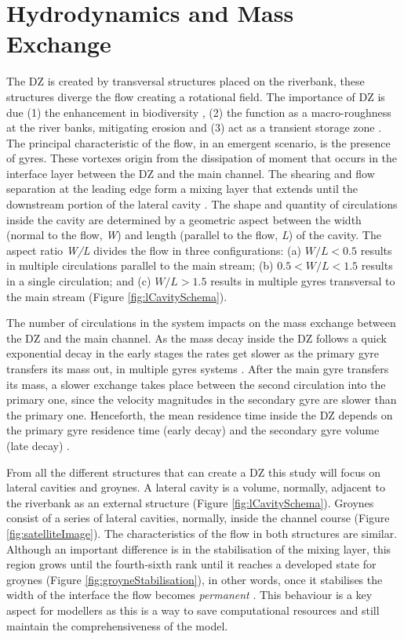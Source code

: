 \section{Hydrodynamics and Mass Exchange}
The DZ is created by transversal structures placed on the riverbank, these structures diverge the flow creating a rotational field. The importance of DZ is due (1) the enhancement in biodiversity \cite{ribi2014,harvey2016}, (2) the function as a macro-roughness at the river banks, mitigating erosion \cite{Juez2018} and (3) act as a transient storage zone \cite{jackson2013,drost2014,jackson2015}. The principal characteristic of the flow, in an emergent scenario, is the presence of gyres. These vortexes origin from the dissipation of moment that occurs in the interface layer between the DZ and the main channel. The shearing and flow separation at the leading edge form a mixing layer that extends until the downstream portion of the lateral cavity \cite{uijttewaal2005,jackson2013}. The shape and quantity of circulations inside the cavity are determined by a geometric aspect between the width (normal to the flow, \textit{W}) and length (parallel to the flow, \textit{L}) of the cavity. The aspect ratio \textit{W/L} divides the flow in three configurations: (a) $W/L<0.5$ results in multiple circulations parallel to the main stream; (b) $0.5<W/L<1.5$ results in a single circulation; and (c) $W/L>1.5$ results in multiple gyres transversal to the main stream \cite{weitbrecht2001,jackson2013,sukhodolov2014}(Figure \ref{fig:lCavitySchema}).

The number of circulations in the system impacts on the mass exchange between the DZ and the main channel. As the mass decay inside the DZ follows a quick exponential decay in the early stages the rates get slower as the primary gyre transfers its mass out, in multiple gyres systems \cite{jackson2012,deOliveira2020}. After the main gyre transfers its mass, a slower exchange takes place between the second circulation into the primary one, since the velocity magnitudes in the secondary gyre are slower than the primary one. Henceforth, the mean residence time inside the DZ depends on the primary gyre residence time (early decay) and the secondary gyre volume (late decay) \cite{jackson2013,deOliveira2020}.

From all the different structures that can create a DZ this study will focus on lateral cavities and groynes. A lateral cavity is a volume, normally, adjacent to the riverbank as an external structure (Figure \ref{fig:lCavitySchema}). Groynes consist of a series of lateral cavities, normally, inside the channel course (Figure \ref{fig:satelliteImage}). The characteristics of the flow in both structures are similar. Although an important difference is in the stabilisation of the mixing layer, this region grows until the fourth-sixth rank until it reaches a developed state for groynes (Figure \ref{fig:groyneStabilisation}), in other words, once it stabilises the width of the interface the flow becomes \textit{permanent} \cite{weitbrecht2004, mcCoy2008, xiang2020}. This behaviour is a key aspect for modellers as this is a way to save computational resources and still maintain the comprehensiveness of the model.

